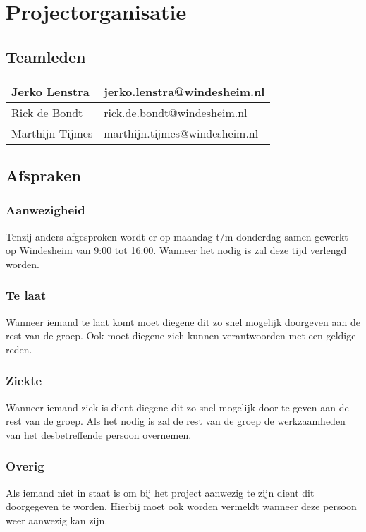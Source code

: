 \section{Projectorganisatie}
\subsection{Teamleden}
\begin{tabularx}{\textwidth}{| X | X |}
	\hline
	Jerko Lenstra & jerko.lenstra@windesheim.nl \\ \hline
	Rick de Bondt & rick.de.bondt@windesheim.nl \\ \hline
	Marthijn Tijmes & marthijn.tijmes@windesheim.nl \\
	\hline
\end{tabularx}

\subsection{Afspraken}
\subsubsection{Aanwezigheid} 
Tenzij anders afgesproken wordt er op maandag t/m donderdag samen gewerkt op Windesheim van 9:00 tot 
16:00. Wanneer het nodig is zal deze tijd verlengd worden.

\subsubsection{Te laat}
Wanneer iemand te laat komt moet diegene dit zo snel mogelijk doorgeven aan 
de rest van de groep. Ook moet diegene zich kunnen verantwoorden met een 
geldige reden.

\subsubsection{Ziekte}
Wanneer iemand ziek is dient diegene dit zo snel mogelijk door te geven aan
de rest van de groep. Als het nodig is zal de rest van de groep de werkzaamheden
van het desbetreffende persoon overnemen. 

\subsubsection{Overig}
Als iemand niet in staat is om bij het project aanwezig te zijn dient dit doorgegeven
te worden. Hierbij moet ook worden vermeldt wanneer deze persoon weer aanwezig kan 
zijn.
